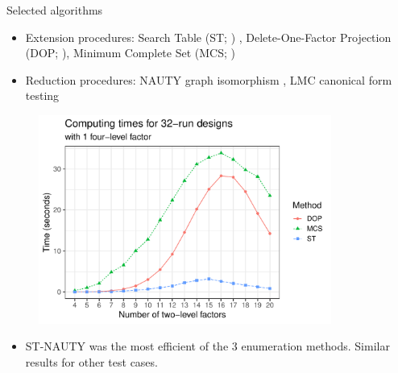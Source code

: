 \documentclass{beamer}
\begin{document}
\begin{frame}[t]
\begin{columns}[t]
\begin{column}{.49\textwidth}
	\end{column}


	\begin{column}{.49\textwidth}
	\justifying
    {\color{kul-blue} \sffamily \large Selected algorithms}
    \begin{itemize}
        \item Extension procedures: Search Table (ST; \cite{bingham_minimum-aberration_1999}) , Delete-One-Factor Projection (DOP; \cite{xu_algorithmic_2009}), Minimum Complete Set (MCS; \cite{schoen_complete_2010}) 
        \item Reduction procedures: NAUTY graph isomorphism \cite{ryan_minimum_2010,mckay_practical_2014}, LMC canonical form testing \cite{schoen_complete_2010}
    \end{itemize}
        
    \vspace{24pt}    
        
    
        
    \vspace{24pt}
        
	\begin{figure}
    	\centering
    	\includegraphics[width=0.9\textwidth]{figures/plot.pdf}
	\end{figure}
    	
	\begin{itemize}
	    \item ST-NAUTY was the most efficient of the 3 enumeration methods. Similar results for other test cases.
	\end{itemize}
    	
    \vspace{24pt}
	

\end{column}
\end{columns}
\end{frame}
\end{document}
